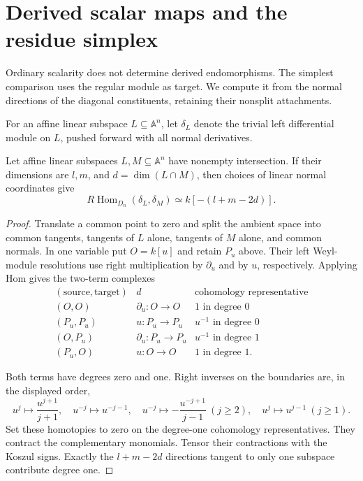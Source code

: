 \section{Derived scalar maps and the residue simplex}
\label{cbc:va:derived-residue}

Ordinary scalarity does not determine derived endomorphisms.
The simplest comparison uses the regular module as target.
We compute it from the normal directions of the diagonal
constituents, retaining their nonsplit attachments.

For an affine linear subspace $L\subseteq\mathbb A^n$,
let $\delta_L$ denote the trivial left differential
module on $L$, pushed forward with all normal derivatives.

\begin{lemma}\label{cbc:va:normal-hom}
Let affine linear subspaces $L,M\subseteq\mathbb A^n$
have nonempty intersection. If their dimensions are
$l,m$, and $d=\dim(L\cap M)$, then choices of linear
normal coordinates give
\[
 R\operatorname{Hom}_{D_n}(\delta_L,\delta_M)
              \simeq k[-(l+m-2d)].
\]
\end{lemma}
\begin{proof}
Translate a common point to zero and split the ambient
space into common tangents, tangents of $L$ alone,
tangents of $M$ alone, and common normals.
In one variable put $O=k[u]$ and retain $P_u$ above.
Their left Weyl-module resolutions use right
multiplication by $\partial_u$ and by $u$, respectively.
Applying Hom gives the two-term complexes
\[
\begin{array}{c|c|c}
 (\text{source},\text{target})&d&\text{cohomology representative}\\\hline
 (O,O)&\partial_u:O\to O&1\text{ in degree }0\\
 (P_u,P_u)&u:P_u\to P_u&u^{-1}\text{ in degree }0\\
 (O,P_u)&\partial_u:P_u\to P_u&u^{-1}\text{ in degree }1\\
 (P_u,O)&u:O\to O&1\text{ in degree }1.
\end{array}
\]

Both terms have degrees zero and one. Right inverses
on the boundaries are, in the displayed order,
\[
 u^j\mapsto\frac{u^{j+1}}{j+1},\quad
 u^{-j}\mapsto u^{-j-1},\quad
 u^{-j}\mapsto-\frac{u^{-j+1}}{j-1}\ (j\geq2),\quad
 u^j\mapsto u^{j-1}\ (j\geq1).
\]
Set these homotopies to zero on the degree-one
cohomology representatives. They contract the complementary
monomials. Tensor their contractions with the Koszul signs.
Exactly the $l+m-2d$ directions tangent to only one
subspace contribute degree one.
\end{proof}

